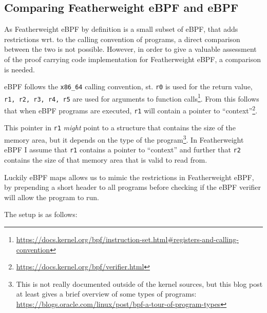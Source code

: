 \subsection{Comparing Featherweight eBPF and eBPF}
\label{subsec:comparing_featherweight_ebpf_and_ebpf}

As Featherweight eBPF by definition is a small subset of eBPF, that adds restrictions wrt. to the calling convention of programs, a direct comparison between the two is not possible.
However, in order to give a valuable assessment of the proof carrying code implementation for Featherweight eBPF, a comparison is needed.


eBPF follows the \texttt{x86\_64} calling convention, st. \texttt{r0} is used for the return value, \texttt{r1, r2, r3, r4, r5} are used for arguments to function calls\footnote{\url{https://docs.kernel.org/bpf/instruction-set.html\#registers-and-calling-convention}}.
From this follows that when eBPF programs are executed, \texttt{r1} will contain a pointer to ``context''\footnote{
  \url{https://docs.kernel.org/bpf/verifier.html}}.

This pointer in \texttt{r1} \textit{might} point to a structure that contains the size of the memory area, but it depends on the type of the program\footnote{This is not really documented outside of the kernel sources, but this blog post at least gives a brief overview of some types of programs:
  \url{https://blogs.oracle.com/linux/post/bpf-a-tour-of-program-types}}.
In Featherweight eBPF I assume that \texttt{r1} contains a pointer to ``context'' and further that \texttt{r2} contains the size of that memory area that is valid to read from.

Luckily eBPF maps allows us to mimic the restrictions in Featherweight eBPF, by prepending a short header to all programs before checking if the eBPF verifier will allow the program to run.

The setup is as follows:

